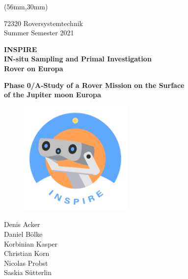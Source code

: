 %
%

\begin{titlepage}
	
	\begin{textblock*}{117mm}(56mm,30mm)
		
		\begin{center}
		
		
			72320 Roversystemtechnik \\
			Summer Semester 2021
			
			
			\vspace{20mm}
			
			\large \textbf{INSPIRE} \\ 
			\vspace{5mm}
			\large \textbf{IN-situ Sampling and Primal Investigation \\ Rover on Europa}
			
			\vspace{20mm}
			
			\large \textbf{Phase 0/A-Study of a Rover Mission on the Surface \\ of the Jupiter moon Europa}
			
			\vspace{10mm}
			
			\begin{figure}[htb]
    		\centering
     		\includegraphics[width=0.5\textwidth]{Media/Logo}
			\end{figure}
			
			\vspace{10mm}
			
			\normalsize 
			Denis Acker \\
			Daniel Bölke \\
			Korbinian Kasper \\
			Christian Korn \\
			Nicolas Probst \\
			Saskia Sütterlin \\
			

\end{center}
\end{textblock*}
\end{titlepage}
